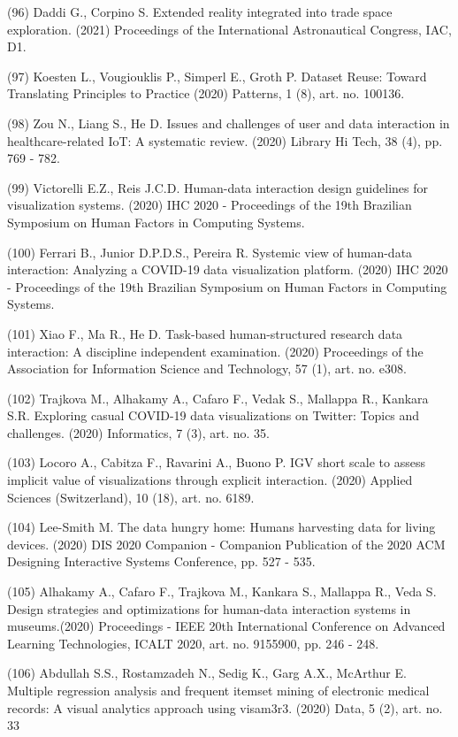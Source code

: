 \documentclass[
	12pt,				%
	oneside,			%
	a4paper,			%
	english,			%
	brazil				%
	]{abntex2ppgsi}
\begin{document}
\begin{apendicesenv}
(96) Daddi G., Corpino S. Extended reality integrated into trade space exploration. (2021) Proceedings of the International Astronautical Congress, IAC, D1.

(97) Koesten L., Vougiouklis P., Simperl E., Groth P. Dataset Reuse: Toward Translating Principles to Practice (2020) Patterns, 1 (8), art. no. 100136.

(98) Zou N., Liang S., He D. Issues and challenges of user and data interaction in healthcare-related IoT: A systematic review. (2020) Library Hi Tech, 38 (4), pp. 769 - 782.

(99) Victorelli E.Z., Reis J.C.D. Human-data interaction design guidelines for visualization systems. (2020) IHC 2020 - Proceedings of the 19th Brazilian Symposium on Human Factors in Computing Systems.

(100) Ferrari B., Junior D.P.D.S., Pereira R. Systemic view of human-data interaction: Analyzing a COVID-19 data visualization platform. (2020) IHC 2020 - Proceedings of the 19th Brazilian Symposium on Human Factors in Computing Systems.

(101) Xiao F., Ma R., He D. Task-based human-structured research data interaction: A discipline independent examination. (2020) Proceedings of the Association for Information Science and Technology, 57 (1), art. no. e308.

(102) Trajkova M., Alhakamy A., Cafaro F., Vedak S., Mallappa R., Kankara S.R. Exploring casual COVID-19 data visualizations on Twitter: Topics and challenges. (2020) Informatics, 7 (3), art. no. 35.

(103) Locoro A., Cabitza F., Ravarini A., Buono P. IGV short scale to assess implicit value of visualizations through explicit interaction. (2020) Applied Sciences (Switzerland), 10 (18), art. no. 6189.

(104) Lee-Smith M. The data hungry home: Humans harvesting data for living devices. (2020) DIS 2020 Companion - Companion Publication of the 2020 ACM Designing Interactive Systems Conference, pp. 527 - 535.

(105) Alhakamy A., Cafaro F., Trajkova M., Kankara S., Mallappa R., Veda S. Design strategies and optimizations for human-data interaction systems in museums.(2020) Proceedings - IEEE 20th International Conference on Advanced Learning Technologies, ICALT 2020, art. no. 9155900, pp. 246 - 248.

(106) Abdullah S.S., Rostamzadeh N., Sedig K., Garg A.X., McArthur E. Multiple regression analysis and frequent itemset mining of electronic medical records: A visual analytics approach using visam3r3. (2020) Data, 5 (2), art. no. 33


\end{apendicesenv}
\end{document}

